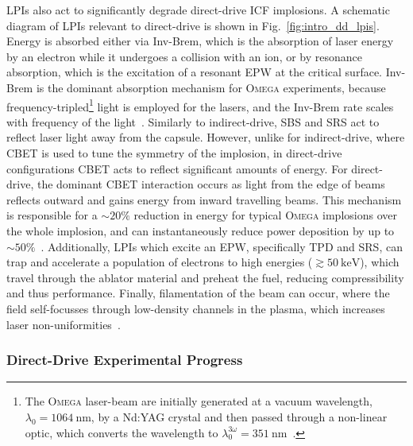 \ac{LPIs} also act to significantly degrade direct-drive \ac{ICF} implosions.
A schematic diagram of \ac{LPIs} relevant to direct-drive is shown in Fig.~\ref{fig:intro_dd_lpis}.
Energy is absorbed either via \ac{Inv-Brem}, which is the absorption of laser energy by an electron while it undergoes a collision with an ion, or by resonance absorption, which is the excitation of a resonant \ac{EPW} at the critical surface.
\ac{Inv-Brem} is the dominant absorption mechanism for \textsc{Omega} experiments, because frequency-tripled\footnote{The \textsc{Omega} laser-beam are initially generated at a vacuum wavelength, $\lambda_0 = 1064\ \text{nm}$, by a Nd:YAG crystal and then passed through a non-linear optic, which converts the wavelength to $\lambda_0^{3\omega}=351\ \text{nm}$~\cite{boehly_upgrade_1995}.} light is employed for the lasers, and the \ac{Inv-Brem} rate scales with frequency of the light~\cite{huba_nrl_2013}.
Similarly to indirect-drive, \ac{SBS} and \ac{SRS} act to reflect laser light away from the capsule.
However, unlike for indirect-drive, where \ac{CBET} is used to tune the symmetry of the implosion, in direct-drive configurations \ac{CBET} acts to reflect significant amounts of energy.
For direct-drive, the dominant \ac{CBET} interaction occurs as light from the edge of beams reflects outward and gains energy from inward travelling beams.
This mechanism is responsible for a $\sim20\%$ reduction in energy for typical \textsc{Omega} implosions over the whole implosion, and can instantaneously reduce power deposition by up to $\sim50\%$~\cite{colaitis_inverse_2021}.
Additionally, \ac{LPIs} which excite an \ac{EPW}, specifically \ac{TPD} and \ac{SRS}, can trap and accelerate a population of electrons to high energies ($\gtrsim50\ \text{keV}$), which travel through the ablator material and preheat the fuel, reducing compressibility and thus performance.
Finally, filamentation of the beam can occur, where the field self-focusses through low-density channels in the plasma, which increases laser non-uniformities~\cite{afshar-rad_evidence_1992}.

\subsubsection{Direct-Drive Experimental Progress}%
\label{sec:intro_direct_exp}

